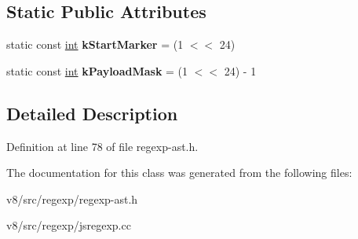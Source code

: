 \subsection*{Static Public Attributes}
\begin{DoxyCompactItemize}
\item 
\mbox{\label{classv8_1_1internal_1_1CharacterRange_af71c0127ae30da61d62047b96dfa1804}} 
static const \mbox{\hyperlink{classint}{int}} {\bfseries k\+Start\+Marker} = (1 $<$$<$ 24)
\item 
\mbox{\label{classv8_1_1internal_1_1CharacterRange_a9bd1ec7131c945c2d221c4d43dec04fb}} 
static const \mbox{\hyperlink{classint}{int}} {\bfseries k\+Payload\+Mask} = (1 $<$$<$ 24) -\/ 1
\end{DoxyCompactItemize}


\subsection{Detailed Description}


Definition at line 78 of file regexp-\/ast.\+h.



The documentation for this class was generated from the following files\+:\begin{DoxyCompactItemize}
\item 
v8/src/regexp/regexp-\/ast.\+h\item 
v8/src/regexp/jsregexp.\+cc\end{DoxyCompactItemize}
